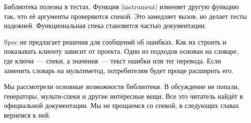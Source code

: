 Библиотека полезна в тестах. Функция \spverb|instrument| изменяет другую функцию
так, что е\"{е} аргументы проверяются спекой. Это замедляет вызов, но делает тесты
надежней. Функциональная спека становится частью документации.

Spec не предлагает решения для сообщений об ошибках. Как их строить и показывать
клиенту зависит от проекта. Один из подходов основан на словаре, где ключи~---
спеки, а значения~--- текст ошибки или тег перевода. Если заменить словарь на
мультиметод, потребителям будет проще расширить его.

Мы рассмотрели основные возможности библиотеки. В обсуждение не попали,
генераторы, мульти-спеки и другие интересные вещи. Все это читатель найд\"{е}т в
официальной документации. Мы не прощаемся со спекой, в следующих главах вернемся
к ней.
